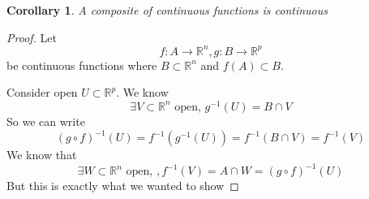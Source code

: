 \documentclass{article}
\newtheorem*{corollary}{Corollary}
\newcommand{\reals}[0]{\mathbb{R}}
\begin{document}
\begin{corollary}
  A composite of continuous functions is continuous
\end{corollary}
\begin{proof}
  Let
  \begin{equation}f: A \to \reals^n, g: B \to \reals^p\end{equation}
  be continuous functions where \(B \subset \reals^n\) and \(f(A) \subset B\).

  Consider open \(U \subset \reals^p\). We know
  \begin{equation}\exists V \subset \reals^n \text{ open, } g^{-1}(U) = B \cap V\end{equation}
  So we can write
  \begin{equation}(g \circ f)^{-1}(U) = f^{-1}(g^{-1}(U)) = f^{-1}(B \cap V) = f^{-1}(V)\end{equation}
  We know that
  \begin{equation}\exists W \subset \reals^n \text{ open, }, f^{-1}(V) = A \cap W = (g \circ f)^{-1}(U)\end{equation}
  But this is exactly what we wanted to show
\end{proof}
\end{document}
